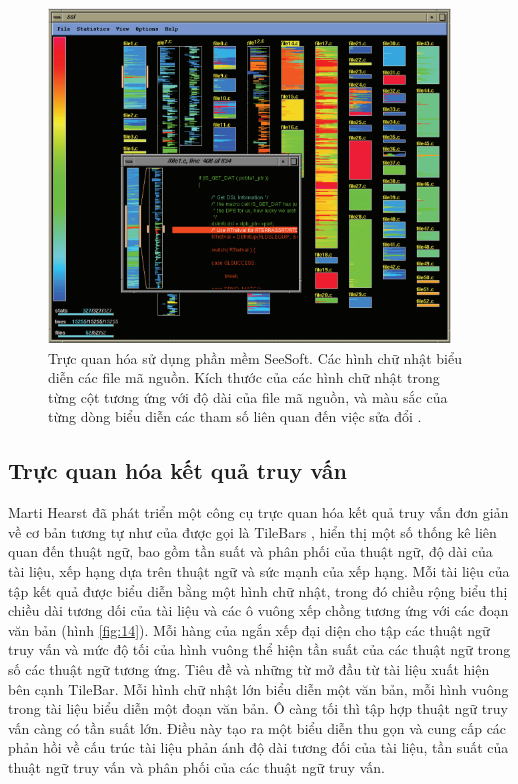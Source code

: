 \documentclass[14pt, a4paper]{article}
\numberwithin{equation}{section}
\numberwithin{figure}{section}
\numberwithin{dl}{section}
\numberwithin{md}{section}
\numberwithin{bd}{section}
\numberwithin{dn}{section}
\numberwithin{hq}{section}
\begin{document}
    \begin{figure}[h!]
        \centering
        \includegraphics[width=0.95\textwidth]{13.png}
        \caption{Trực quan hóa sử dụng phần mềm SeeSoft. Các hình chữ nhật biểu diễn các file mã nguồn.
        Kích thước của các hình chữ nhật trong từng cột tương ứng với độ dài của file mã nguồn, và màu sắc của từng dòng biểu diễn các tham số liên quan đến việc sửa đổi \cite{108}.}
        \label{fig:13}
    \end{figure}

    \subsection{Trực quan hóa kết quả truy vấn}

    Marti Hearst đã phát triển một công cụ trực quan hóa kết quả truy vấn đơn giản về cơ bản tương tự như của \cite{232} được gọi là TileBars \cite{178},
    hiển thị một số thống kê liên quan đến thuật ngữ, bao gồm tần suất và phân phối của thuật ngữ, độ dài của tài liệu, xếp hạng dựa trên thuật ngữ và sức mạnh của xếp hạng.
    Mỗi tài liệu của tập kết quả được biểu diễn bằng một hình chữ nhật, trong đó chiều rộng biểu thị chiều dài tương dối của tài liệu và các ô vuông xếp chồng tương ứng với các đoạn văn bản (hình \ref{fig:14}).
    Mỗi hàng của ngắn xếp đại diện cho tập các thuật ngữ truy vấn và mức độ tối của hình vuông thể hiện tần suất của các thuật ngữ trong số các thuật ngữ tương ứng.
    Tiêu đề và những từ mở đầu từ tài liệu xuất hiện bên cạnh TileBar.
    Mỗi hình chữ nhật lớn biểu diễn một văn bản, mỗi hình vuông trong tài liệu biểu diễn một đoạn văn bản.
    Ô càng tối thì tập hợp thuật ngữ truy vấn càng có tần suất lớn.
    Điều này tạo ra một biểu diễn thu gọn và cung cấp các phản hồi về cấu trúc tài liệu phản ánh độ dài tương đối của tài liệu,
    tần suất của thuật ngữ truy vấn và phân phối của các thuật ngữ truy vấn.
\end{document}

